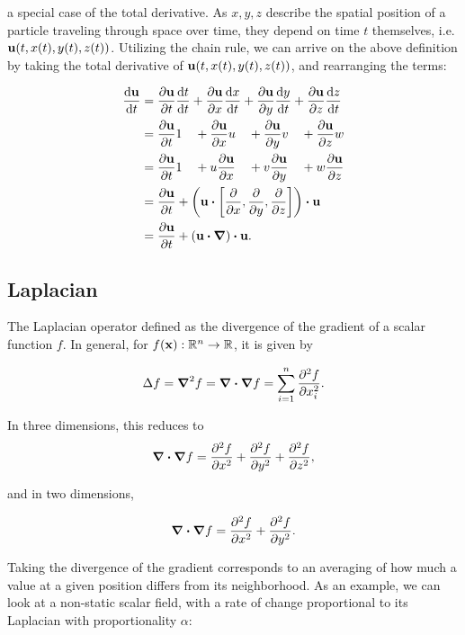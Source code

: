 a special case of the total derivative. As $x, y, z$ describe the spatial
position of a particle traveling through space over time, they depend on time
$t$ themselves, i.e. $\vb{u}(t, x(t), y(t), z(t))$. Utilizing the chain rule,
we can arrive on the above definition by taking the total derivative of
$\vb{u}(t, x(t), y(t), z(t))$, and rearranging the terms:

\begin{alignat*}{2}\label{eq:material-derivative}
    \dv{\vb{u}}{t} &= \pdv{\vb{u}}{t}\dv{t}{t} 
                    + \pdv{\vb{u}}{x}\dv{x}{t} 
                    + \pdv{\vb{u}}{y}\dv{y}{t} 
                    + \pdv{\vb{u}}{z}\dv{z}{t} \\
                    &= \pdv{\vb{u}}{t} 1 \quad
                    + \pdv{\vb{u}}{x} u \quad
                    + \pdv{\vb{u}}{y} v \quad
                    + \pdv{\vb{u}}{z} w \\
                    &= \pdv{\vb{u}}{t} 1 \quad
                    + u \pdv{\vb{u}}{x} \quad
                    + v \pdv{\vb{u}}{y} \quad
                    + w \pdv{\vb{u}}{z} \\
                    &= \pdv{\vb{u}}{t} +
                    \qty(
                        \vb{u}
                        \vdot
                        \left[ \pdv{x}, \pdv{y}, \pdv{z} \right]
                    ) \vdot \vb{u} \\
                    &= \pdv{\vb{u}}{t}
                    + \qty(\vb{u}\vdot\grad)\vdot\vb{u}.
\end{alignat*}

\subsection*{Laplacian}
The Laplacian operator defined as the divergence of the gradient of a scalar
function $f$. In general, for $f(\vb{x}): \mathbb{R}^n \to \mathbb{R}$, it is
given by

    $$\Delta f = \grad^2{f} = \grad \vdot \grad f = \sum_{i=1}^n
\pdv[2]{f}{x_i}.$$

In three dimensions, this reduces to 
$$\grad \vdot \grad f = \pdv[2]{f}{x} + \pdv[2]{f}{y} + \pdv[2]{f}{z},$$

and in two dimensions,

$$ \grad \vdot \grad f = \pdv[2]{f}{x} + \pdv[2]{f}{y}.$$

Taking the divergence of the gradient corresponds to an averaging of how much
a value at a given position differs from its neighborhood. As an example, we
can look at a non-static scalar field, with a rate of change proportional to
its Laplacian with proportionality $\alpha$:

